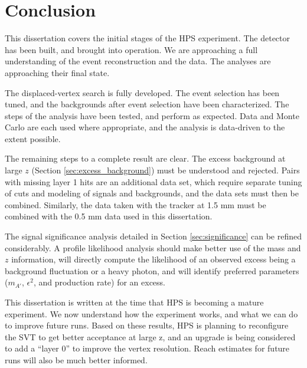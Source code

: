 \chapter{Conclusion}
This dissertation covers the initial stages of the HPS experiment.
The detector has been built, and brought into operation.
We are approaching a full understanding of the event reconstruction and the data.
The analyses are approaching their final state.

The displaced-vertex search is fully developed.
The event selection has been tuned, and the backgrounds after event selection have been characterized.
The steps of the analysis have been tested, and perform as expected.
Data and Monte Carlo are each used where appropriate, and the analysis is data-driven to the extent possible.


The remaining steps to a complete result are clear.
The excess background at large $z$ (Section \ref{sec:excess_background}) must be understood and rejected.
Pairs with missing layer 1 hits are an additional data set, which require separate tuning of cuts and modeling of signals and backgrounds, and the data sets must then be combined.
Similarly, the data taken with the tracker at 1.5 mm must be combined with the 0.5 mm data used in this dissertation.

The signal significance analysis detailed in Section \ref{sec:significance} can be refined considerably.
A profile likelihood analysis should make better use of the mass and $z$ information, will directly compute the likelihood of an observed excess being a background fluctuation or a heavy photon, and will identify preferred parameters ($m_{A'}$, $\epsilon^2$, and production rate) for an excess.

This dissertation is written at the time that HPS is becoming a mature experiment.
We now understand how the experiment works, and what we can do to improve future runs.
Based on these results, HPS is planning to reconfigure the SVT to get better acceptance at large z, and an upgrade is being considered to add a ``layer 0'' to improve the vertex resolution.
Reach estimates for future runs will also be much better informed.
